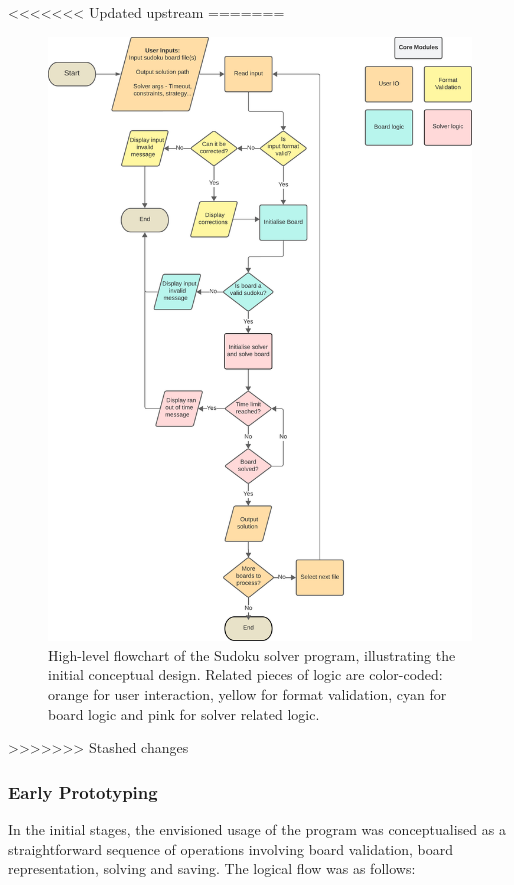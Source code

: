 \documentclass[11pt]{article}
\begin{document}
<<<<<<< Updated upstream
=======
\begin{figure}[H]
\centering
\includegraphics[width=1\textwidth]{figs/solver_flowchart.png}
\caption{High-level flowchart of the Sudoku solver program, illustrating the initial conceptual design. Related pieces of logic are color-coded: orange for user interaction, yellow for format validation, cyan for board logic and pink for solver related logic.}


\label{fig:solver_flowchart}
\end{figure}

>>>>>>> Stashed changes
\subsubsection{Early Prototyping}
In the initial stages, the envisioned usage of the program was conceptualised as a straightforward sequence of operations involving board validation, board representation, solving and saving. The logical flow was as follows:
\end{document}

